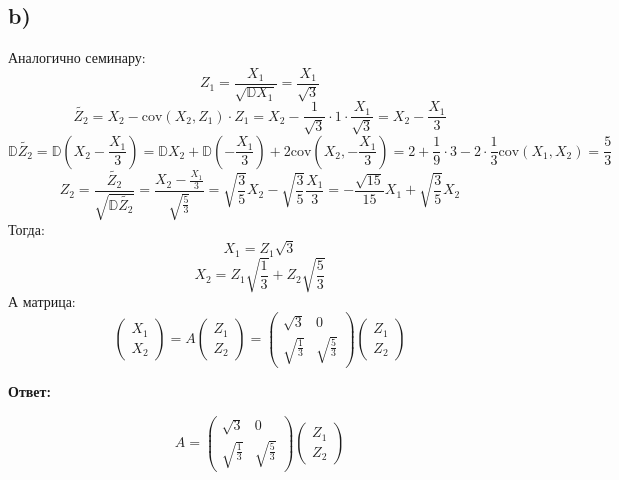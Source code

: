 \documentclass[a4paper,12pt]{article}
\begin{document}
\subsection*{b)}
Аналогично семинару:
\[
Z_1 = \frac{X_1}{\sqrt{\mathbb{D}X_1}} =  \frac{X_1}{\sqrt{3}}
\]
\[
\tilde{Z_2}= X_2 - \text{cov}(X_2, Z_1) \cdot Z_1  = X_2 - \frac{1}{\sqrt{3}} \cdot 1 \cdot \frac{X_1}{\sqrt{3}} = X_2 - \frac{X_1}{3}
\]
\[
\mathbb{D} \tilde{Z_2} = \mathbb{D} \left(
X_2 - \frac{X_1}{3}
\right) = \mathbb{D}X_2 + \mathbb{D}\left(-\frac{X_1}{3}\right) + 2 \text{cov} \left(
X_2, -\frac{X_1}{3}
\right) = 2 + \frac{1}{9} \cdot 3 - 2 \cdot \frac{1}{3} \text{cov} \left(
X_1, X_2\right) = \frac{5}{3}
\]
\[
Z_2 = \frac{\tilde{Z_2}}{\sqrt{\mathbb{D}\tilde{Z_2}}} = \frac{X_2 - \frac{X_1}{3}}{\sqrt{\frac{5}{3}}} = \sqrt{\frac{3}{5}}X_2  - \sqrt{\frac{3}{5}}\frac{X_1}{3}  = - \frac{\sqrt{15}}{15}X_1 + \sqrt{\frac{3}{5}} X_2
\]
Тогда:
\[
X_1 = Z_1\sqrt{3}
\]
\[
X_2 = Z_1 \sqrt{\frac{1}{3}} + 
Z_2  \sqrt{\frac{5}{3}}
\]
А матрица:
\[
\begin{pmatrix}
X_1 \\ X_2 
\end{pmatrix} = A \begin{pmatrix}
Z_1 \\ Z_2
\end{pmatrix}  = \begin{pmatrix}
\sqrt{3} & 0 \\
\sqrt{\frac{1}{3}}& \sqrt{\frac{5}{3}}
\end{pmatrix}\begin{pmatrix}
Z_1 \\ Z_2
\end{pmatrix}  
\]
\begin{center}
\textbf{Ответ: } 
\end{center}
\[
A =  \begin{pmatrix}
\sqrt{3} & 0 \\
\sqrt{\frac{1}{3}}& \sqrt{\frac{5}{3}}
\end{pmatrix}\begin{pmatrix}
Z_1 \\ Z_2
\end{pmatrix}  
\]
\end{document}
